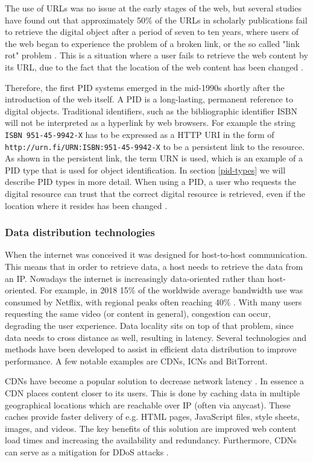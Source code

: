 The use of URLs was no issue at the early stages of the web, but several studies have found out that approximately 50\% of the URLs in scholarly publications fail to retrieve the digital object after a period of seven to ten years, where users of the web began to experience the problem of a broken link, or the so called "link rot" problem \cite{rot-link1, rot-link2}. This is a situation where a user fails to retrieve the web content by its URL, due to the fact that the location of the web content has been changed \cite{icn-bd, ark-id}. 

Therefore, the first PID systems emerged in the mid-1990s shortly after the introduction of the web itself. A PID is a long-lasting, permanent reference to digital objects. Traditional identifiers, such as the bibliographic identifier ISBN will not be interpreted as a hyperlink by web browsers. For example the string \texttt{ISBN 951-45-9942-X} has to be expressed as a HTTP URI in the form of \texttt{http://urn.fi/URN:ISBN:951-45-9942-X} to be a persistent link to the resource. As shown in the persistent link, the term URN is used, which is an example of a PID type that is used for object identification. In section \ref{pid-types} we will describe PID types in more detail. When using a PID, a user who requests the digital resource can trust that the correct digital resource is retrieved, even if the location where it resides has been changed \cite{pid-oview}.

\subsubsection{Data distribution technologies}
\label{introduction-ndn}
When the internet was conceived it was designed for host-to-host communication. This means that in order to retrieve data, a host needs to retrieve the data from an IP. Nowadays the internet is increasingly data-oriented rather than host-oriented. For example, in 2018 15\% of the worldwide average bandwidth use was consumed by Netflix, with regional peaks often reaching 40\% \cite{introduction-netflix}. With many users requesting the same video (or content in general), congestion can occur, degrading the user experience. Data locality sits on top of that problem, since data needs to cross distance as well, resulting in latency. Several technologies and methods have been developed to assist in efficient data distribution to improve performance. A few notable examples are CDNs, ICNs and BitTorrent.

CDNs have become a popular solution to decrease network latency \cite{lee2012towards}. In essence a CDN places content closer to its users. This is done by caching data in multiple geographical locations which are reachable over IP (often via anycast). These caches provide faster delivery of e.g. HTML pages, JavaScript files, style sheets, images, and videos. The key benefits of this solution are improved web content load times and increasing the availability and redundancy. Furthermore, CDNs can serve as a mitigation for DDoS attacks \cite{cloudflare-cdn}.

